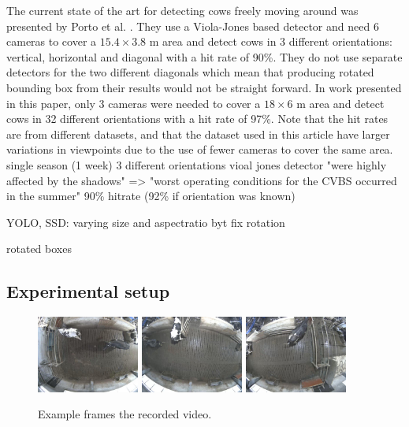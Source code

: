 \documentclass{IET}
\begin{document}
The current state of the art for detecting cows freely moving around was presented by Porto et al. \cite{porto2015automatic}. They use a Viola-Jones based detector and need 
6 cameras to cover a $15.4 \times 3.8$ m area and detect cows in 3 different orientations: vertical, horizontal and diagonal with a hit rate of 90\%. They do not use separate detectors for the two different diagonals which mean that producing rotated bounding box from their results would not be straight forward. In work presented in this paper, only 3 cameras were needed to cover a $18 \times 6$ m area and detect cows in 32 different orientations with a hit rate of 97\%. Note that the hit rates are from different datasets, and that the dataset used in this article have larger variations in viewpoints due to the use of fewer cameras to cover the same area.
single season (1 week)
3 different orientations
vioal jones detector
"were highly affected by the shadows" => "worst operating
conditions for the CVBS occurred in the summer"
90\% hitrate (92\% if orientation was known)


YOLO, SSD: varying size and aspectratio byt fix rotation

rotated boxes

\subsection{Experimental setup}

\begin{figure}[tb]
\begin{center}
  \includegraphics[width=0.3\textwidth]{old-2.jpg}
  \includegraphics[width=0.3\textwidth]{old-1.jpg}
  \includegraphics[width=0.3\textwidth]{old-0.jpg}
\end{center}
  \caption{Example frames the recorded video.}
  \label{fig:old}
\end{figure}
\end{document}
